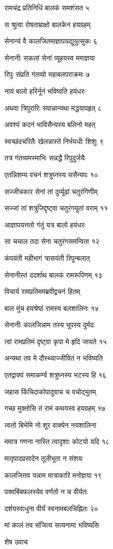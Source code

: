 रामचंद्र प्रतिनिधिं बालकं समशंसत ५

स श्रुत्वा रोषताम्राक्षो बालकेन हयग्रहम्

सेनान्यं वै कालजितमाज्ञापयद्युयुत्सुकः ६

सेनानीः सकलां सेनां व्यूहयस्व ममाज्ञया

रिपुः संप्रति गंतव्यो महाबलपराक्रमः ७

नायं बालो हरिर्नूनं भविष्यति हयंधरः

अथवा त्रिपुरारिः स्यान्नान्यथा मद्धयापहृत् ८

अवश्यं कदनं भाविसैन्यस्य बलिनो महत्

स्वच्छंदचरितैः खेलन्नास्ते निर्भयधीः शिशुः ९

तत्र गंतव्यमस्माभिः सन्नद्धै रिपुदुर्जयैः

एतन्निशम्य वचनं शत्रुघ्नस्य ससैन्यपः १०

सज्जीचकार सेनां तां दुर्व्यूढां चतुरंगिणीम्

सज्जां तां शत्रुजिद्दृष्ट्वा चतुरंगयुतां वराम् ११

आज्ञापयत्ततो गंतुं यत्र बालो हयंधरः

सा चचाल तदा सेना चतुरंगसमन्विता १२

कंपयंती महीभागं त्रासयंती रिपून्बलात्

सेनानीस्तं ददर्शाथ बालकं रामरूपिणम् १३

विचार्य रामप्रतिममब्रवीद्वचनं हितम्

बाल मुंच हयश्रेष्ठं रामस्य बलशालिनः १४

सेनानीः कालजिन्नाम तस्य भूपस्य दुर्मदः

त्वां रामप्रतिमं दृष्ट्वा कृपा मे हृदि जायते १५

अन्यथा तव मे दौस्थ्याज्जीवितं न भविष्यति

एतद्वाक्यं समाकर्ण्य शत्रुघ्नस्य भटस्य हि १६

जहास किंचिदाकोपादुवाच च वचोद्भुतम्

गच्छ मुक्तोसि तं रामं कथयस्व हयग्रहम् १७

त्वत्तो बिभेमि नो शूर वाक्येन नयशालिना

ममात्र गणना नास्ति त्वादृशाः कोटयो यदि १८

मातृपादप्रसादेन तूलीभूता न संशयः

कालजित्तव यन्नाम मात्राकारि मनोज्ञया १९

पक्वबिंबफलस्येव वर्णतो न च वीर्यतः

दर्शयस्वाधुना वीर्यं स्वनामबलचिह्नितः २०

मां कालं तव संजित्य सत्यनामा भविष्यसि

शेष उवाच

